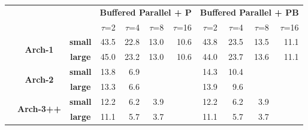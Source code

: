 \documentclass[10pt, review=true,sigconf]{acmart}
\begin{document}
\begin{table}[htbp]
	\centering
	{\def\arraystretch{1.0}
		\begin{tabular}{ccc||rrrr|rrrr}  
			&&                 & \multicolumn{4}{c|}{\textbf{Buffered Parallel + P}} & \multicolumn{4}{c}{\textbf{Buffered Parallel + PB}} \\
			&&                 &  $\tau$=2    & $\tau$=4    & $\tau$=8    & $\tau$=16  &  $\tau$=2   & $\tau$=4   & $\tau$=8   & $\tau$=16 \\ \hline
			
	\multicolumn{1}{l}{\multirow{6}{*}{{\rotatebox[origin=c]{90}{\textbf{Uniform}}}}}
			&\multirow{2}{*}{\textbf{Arch-1}} & \textbf{small}  &  43.5   & 22.8   & 13.0   & 10.6   &  43.8    & 23.5   & 13.5   & 11.1   \\
			&& \textbf{large} & 45.0   & 23.2   &   13.0 & 10.6   & 	44.0 &	23.7	& 13.6	& 11.1 \\ \cline{2-11}
			
			&\multirow{2}{*}{\textbf{Arch-2}} & \textbf{small}  &  13.8   & 6.9   &        &       &  14.3   & 10.4   &        &       \\
			&& \textbf{large} &    13.3     &       6.6 &        &       &          13.9    &     9.6   &        &   \\ \cline{2-11}
			
			&\multirow{2}{*}{\textbf{Arch-3++}} & \textbf{small}  &  12.2   & 6.2  & 3.9     &       &    12.2   & 6.2   &   3.9     &       \\
			&& \textbf{large} &    11.1     & 5.7 &  3.7      &       &          11.1   &     5.7   &   3.7     &   \\%
		\hline\hline
%			
%			
			

\end{tabular}}
\end{table}
\end{document}
